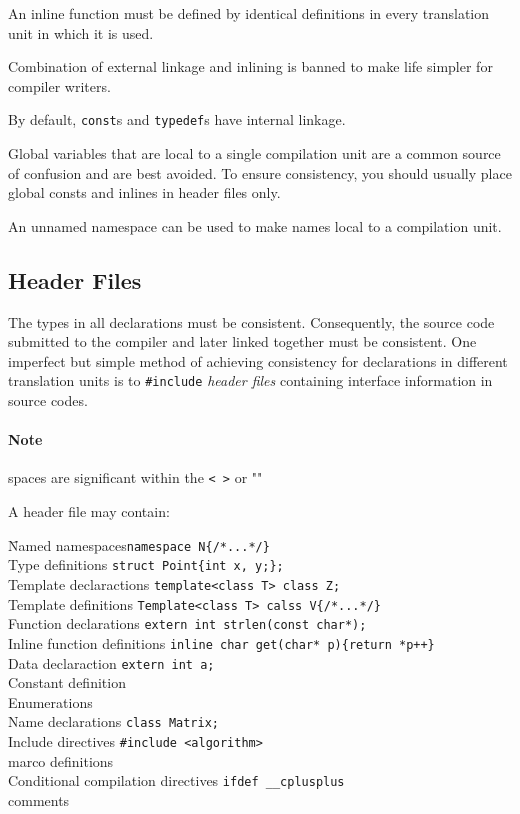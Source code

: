 \documentclass[a4paper,12pt]{book}
\begin{document}
An inline function must be defined by identical definitions in every translation unit in which it is used.

Combination of external linkage and inlining is banned to make life simpler for compiler writers.

By default, \verb|const|s and \verb|typedef|s have internal linkage.

Global variables that are local to a single compilation unit are a common source of confusion and are best avoided. To ensure consistency, you should usually place global consts and inlines in header files only.

An unnamed namespace can be used to make names local to a compilation unit. 
\subsection{Header Files}
The types in all declarations must be consistent. Consequently, the source code submitted to the compiler and later linked together must be consistent. One imperfect but simple method of achieving consistency for declarations in different translation units is to \verb|#include| \emph{header files} containing interface information in source codes.

\paragraph{Note} spaces are significant within the \verb|< >| or ""

A header file may contain:

\begin{tabbing}
\hspace{1cm}\= Named namespaces\hspace{3cm}\quad\= \verb|namespace N{/*...*/}|\\
	\>Type definitions \>\verb|struct Point{int x, y;};|\\
	\>Template declaractions \>\verb|template<class T> class Z;|\\
	\>Template definitions \>\verb|Template<class T> calss V{/*...*/}|\\
	\>Function declarations \>\verb|extern int strlen(const char*);|\\
	\>Inline function definitions \>\verb|inline char get(char* p){return *p++}|\\
	\>Data declaraction \>\verb|extern int a;|\\
	\>Constant definition\\
	\>Enumerations\\
	\>Name declarations \>\verb|class Matrix;|\\
	\>Include directives \>\verb|#include <algorithm>|\\
	\>marco definitions\\
	\>Conditional compilation directives \>\verb|ifdef __cplusplus|\\
	\>comments\\


\end{tabbing}
\end{document}
